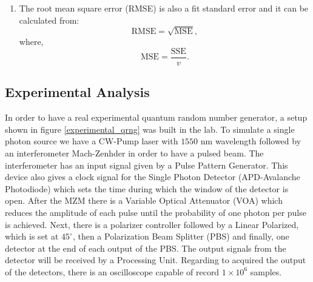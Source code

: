 \begin{enumerate}
  \item The root mean square error (RMSE) is also a fit standard error and it can be calculated from:
    \begin{equation}\label{}
      \textrm{RMSE} = \sqrt{\textrm{MSE}},
      \nonumber
    \end{equation}
    where,
    \begin{equation}\label{}
      \textrm{MSE} = \frac{\textrm{SSE}}{v}.
      \nonumber
    \end{equation}

\end{enumerate} 

\subsection{Experimental Analysis}

In order to have a real experimental quantum random number generator, a setup shown in figure \ref{experimental_qrng} was built in the lab. To simulate a single photon source we have a CW-Pump laser with $1550$ nm wavelength followed by an interferometer Mach-Zenhder in order to have a pulsed beam. The interferometer has an input signal given by a Pulse Pattern Generator. This device also gives a clock signal for the Single Photon Detector (APD-Avalanche Photodiode) which sets the time during which the window of the detector is open. After the MZM there is a Variable Optical Attenuator (VOA) which reduces the amplitude of each pulse until the probability of one photon per pulse is achieved. Next, there is a polarizer controller followed by a Linear Polarized, which is set at $45^{\circ}$, then a Polarization Beam Splitter (PBS) and finally, one detector at the end of each output of the PBS. The output signals from the detector will be received by a Processing Unit. Regarding to acquired the output of the detectors, there is an oscilloscope capable of record $1 \times 10^{6}$ samples.



